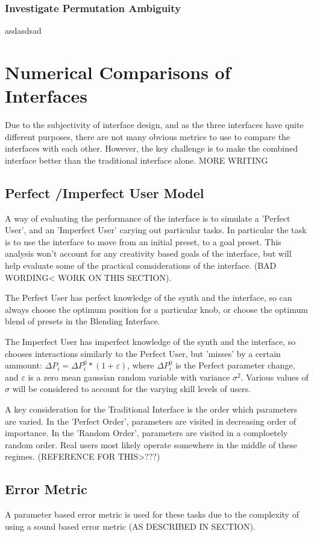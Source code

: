 \documentclass[11pt, oneside]{report}   	%
\begin{document}
\subsection{Investigate Permutation Ambiguity}
asdasdsad

\chapter{Numerical Comparisons of Interfaces}
Due to the subjectivity of interface design, and as the three interfaces have quite different purposes, there are not many obvious metrics to use to compare the interfaces with each other. However, the key challenge is to make the combined interface better than the traditional interface alone. MORE WRITING
\section{Perfect /Imperfect User Model}
A way of evaluating the performance of the interface is to simulate a 'Perfect User', and an 'Imperfect User' carying out particular tasks. In particular the task is to use the interface to move from an initial preset, to a goal preset. This analysis won't account for any creativity based goals of the interface, but will help evaluate some of the practical comsiderations of the interface. (BAD WORDING< WORK ON THIS SECTION).
 
The Perfect User has perfect knowledge of the synth and the interface, so can always choose the optimum position for a particular knob, or choose the optimum blend of presets in the Blending Interface.

The Imperfect User has imperfect knowledge of the synth and the interface, so chooses interactions similarly to the Perfect User, but 'misses' by a certain ammount: $\Delta P_i = \Delta P_i^0 * (1 + \varepsilon)$, where $\Delta P_i^0$ is the Perfect parameter change, and $\varepsilon$ is a zero mean gaussian random variable with variance $\sigma^2$. Various values of $\sigma$ will be considered to account for the varying skill levels of users.

A key consideration for the Traditional Interface is the order which parameters are varied. In the 'Perfect Order', parameters are visited in decreasing order of importance. In the 'Random Order', parameters are visited in a comploetely random order. Real users most likely operate somewhere in the middle of these regimes. (REFERENCE FOR THIS>???)

\section{Error Metric}
A parameter based error metric is used for these tasks due to the complexity of using a sound based error metric (AS DESCRIBED IN SECTION). 
\end{document}
